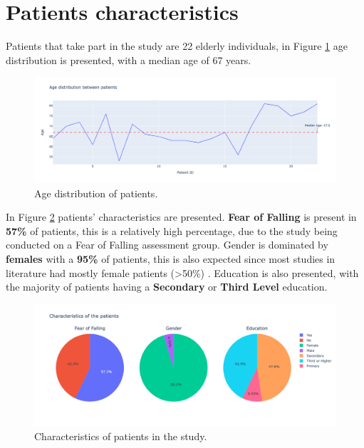     \section{Patients characteristics}
        Patients that take part in the study are 22 elderly individuals, in Figure \ref{fig:age_distribution} age distribution is presented, with a median age of 67 years. 
        \newpage 
        \begin{figure}[H]
            \centering
            \includegraphics[width=1.0\textwidth]{./resources/plots/patients/age.png}
            \caption{Age distribution of patients.}
            \label{fig:age_distribution}
        \end{figure}

        In Figure \ref{fig:patients_characteristics} patients' characteristics are presented. \textbf{Fear of Falling} is present in \textbf{57\%} of patients, this is a relatively high percentage, due to the study being conducted on a Fear of Falling assessment group. Gender is dominated by \textbf{females} with a \textbf{95\%} of patients, this is also expected since most studies in literature had mostly female patients (>50\%) \cite{mackay_fear_2021}. Education is also presented, with the majority of patients having a \textbf{Secondary} or \textbf{Third Level} education.
        
        \begin{figure}[H]
            \centering
            \includegraphics[width=1.0\textwidth]{./resources/plots/patients/chars.png}
            \caption{Characteristics of patients in the study.}
            \label{fig:patients_characteristics}
        \end{figure}

